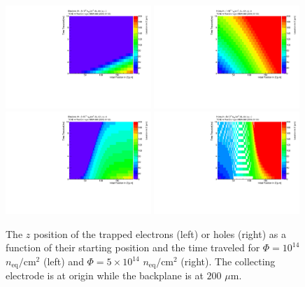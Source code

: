 \begin{figure}[!htpb]
\centering
\includegraphics[width=0.49\textwidth]{distance_maps_e1e14.pdf}
\includegraphics[width=0.49\textwidth]{distance_maps_h1e14.pdf}
\includegraphics[width=0.49\textwidth]{distance_maps_e5e14.pdf}
\includegraphics[width=0.49\textwidth]{distance_maps_h5e14.pdf}
\caption{The $z$ position of the trapped electrons (left) or holes (right) as a function of their starting position and the time traveled for $\Phi=10^{14}$ $n_\text{eq}/\text{cm}^2$ (left) and $\Phi=5\times10^{14}$ $n_\text{eq}/\text{cm}^2$ (right).  The collecting electrode is at origin while the backplane is at $200$ $\mu$m.  }
\label{fig:posattrap}
\end{figure}

